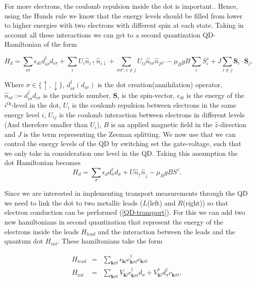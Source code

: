 For more electrons, the coulomb
repulsion inside the dot is important.. Hence, using the Hunds rule we know that the energy levels should be filled from lower to higher energies with two electrons with different spin at each state. Taking in account
all these interactions we can get to a second quantization QD-Hamiltonian
of the form \citep[(3.2)]{sindel_numerical_2005}

\[
H_{d}=\sum_{i\sigma}\epsilon_{di}d_{i\sigma}^{\dagger}d_{i\sigma}+\sum_{i}U_{i}\hat{n}_{i\uparrow}\hat{n}_{i\downarrow}+\sum_{\sigma\sigma',i\neq j}U_{ij}\hat{n}_{i\sigma}\hat{n}_{j\sigma'}-\mu_{B}gB\sum_{i}S_{i}^{z}+J\sum_{i\neq j}\mathbf{S}_{i}\cdot\mathbf{S}_{j}.
\]


Where $\sigma\in\{\uparrow,\downarrow\}$, $d_{i\sigma}^{\dagger}\left(d_{i\sigma}\right)$
is the dot creation(annihilation) operator,$\hat{n}_{i\sigma}:=d_{i\sigma}^{\dagger}d_{i\sigma}$
is the particle number, $\mathbf{S}_{i}$ is the spin-vector, $\epsilon_{di}$
is the energy of the $i^{\mbox{th}}$-level in the dot, $U_{i}$ is
the coulomb repulsion between electrons in the same energy level $i$,
$U_{ij}$ is the coulomb interaction between electrons in different
levels (And therefore smaller than $U_{i}$), \textbf{$B$} is an
applied magnetic field in the $\hat{z}$-direction and $J$ is the
term representing the Zeeman splitting. We now use that we can control
the energy levels of the QD by switching set the gate-voltage, such
that we only take in consideration one level in the QD. Taking this
assumption the dot Hamiltonian becomes \\


\[
H_{d}=\sum_{\sigma}\epsilon_{d}d_{\sigma}^{\dagger}d_{\sigma}+U\hat{n}_{\uparrow}\hat{n}_{\downarrow}-\mu_{B}gBS^{z}.
\]


Since we are interested in implementing transport measurements through
the QD we need to link the dot to two metallic leads ($L$(left) and
$R$(right)) so that electron conduction can be performed (\ref{QD-transport}).
For this we can add two new hamiltonians in second quantization that
represent the energy of the electrons inside the leads $H_{lead}$
and the interaction between the leads and the quantum dot $H_{int}$.
These hamiltonians take the form 

\begin{eqnarray*}
H_{lead} & = & \sum_{\mathbf{k}\sigma l}\epsilon_{\mathbf{k}l}c_{\mathbf{k}\sigma l}^{\dagger}c_{\mathbf{k}\sigma l}\\
H_{int} & = & \sum_{\mathbf{k}\sigma l}V_{\mathbf{k}l}c_{\mathbf{k}\sigma l}^{\dagger}d_{\sigma}+V_{\mathbf{k}l}^{*}d_{\sigma}^{\dagger}c_{\mathbf{k}\sigma l},
\end{eqnarray*}


